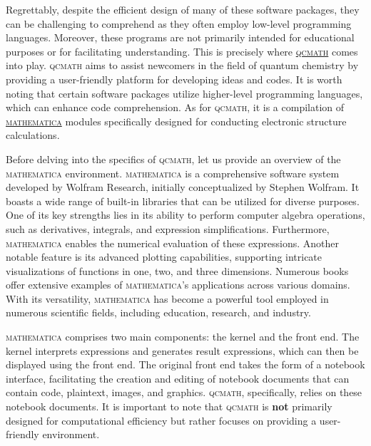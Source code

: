 \documentclass[aip,jcp,reprint,noshowkeys,superscriptaddress]{revtex4-1}
\newcommand{\qcmath}{\textsc{qcmath}\xspace}
\newcommand{\mathematica}{\textsc{mathematica}\xspace}
\begin{document}
Regrettably, despite the efficient design of many of these software packages, they can be challenging to comprehend as they often employ low-level programming languages. Moreover, these programs are not primarily intended for educational purposes or for facilitating understanding. This is precisely where \href{https://github.com/LCPQ/qcmath}{\qcmath} comes into play. \qcmath aims to assist newcomers in the field of quantum chemistry by providing a user-friendly platform for developing ideas and codes. It is worth noting that certain software packages utilize higher-level programming languages, which can enhance code comprehension. As for \qcmath, it is a compilation of \href{https://www.wolfram.com/mathematica/}{\mathematica} modules specifically designed for conducting electronic structure calculations.

Before delving into the specifics of \qcmath, let us provide an overview of the \mathematica environment. \mathematica is a comprehensive software system developed by Wolfram Research, initially conceptualized by Stephen Wolfram. It boasts a wide range of built-in libraries that can be utilized for diverse purposes. One of its key strengths lies in its ability to perform computer algebra operations, such as derivatives, integrals, and expression simplifications. Furthermore, \mathematica enables the numerical evaluation of these expressions. Another notable feature is its advanced plotting capabilities, supporting intricate visualizations of functions in one, two, and three dimensions. Numerous books offer extensive examples of \mathematica's applications across various domains. With its versatility, \mathematica has become a powerful tool employed in numerous scientific fields, including education, research, and industry.

\mathematica comprises two main components: the kernel and the front end. The kernel interprets expressions and generates result expressions, which can then be displayed using the front end. The original front end takes the form of a notebook interface, facilitating the creation and editing of notebook documents that can contain code, plaintext, images, and graphics. \qcmath, specifically, relies on these notebook documents. It is important to note that \qcmath is \textbf{not} primarily designed for computational efficiency but rather focuses on providing a user-friendly environment.

\end{document}
